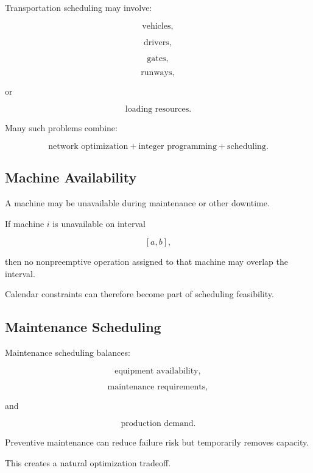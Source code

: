 Transportation scheduling may involve:

\[
\boxed{
\text{vehicles},
}
\]

\[
\boxed{
\text{drivers},
}
\]

\[
\boxed{
\text{gates},
}
\]

\[
\boxed{
\text{runways},
}
\]

or

\[
\boxed{
\text{loading resources}.
}
\]

Many such problems combine:

\[
\boxed{
\text{network optimization}
+
\text{integer programming}
+
\text{scheduling}.
}
\]

\subsection{Machine Availability}
\label{subsec:machine-availability}

A machine may be unavailable during maintenance or other downtime.

If machine \(i\) is unavailable on interval

\[
[a,b],
\]

then no nonpreemptive operation assigned to that machine may overlap the
interval.

Calendar constraints can therefore become part of scheduling feasibility.

\subsection{Maintenance Scheduling}
\label{subsec:maintenance-scheduling}

Maintenance scheduling balances:

\[
\boxed{
\text{equipment availability},
}
\]

\[
\boxed{
\text{maintenance requirements},
}
\]

and

\[
\boxed{
\text{production demand}.
}
\]

Preventive maintenance can reduce failure risk but temporarily removes
capacity.

This creates a natural optimization tradeoff.

